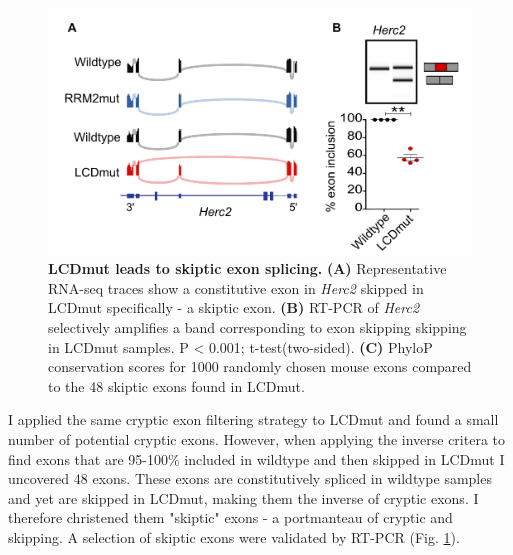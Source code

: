 \begin{figure}[h!]
	\centering
	\includegraphics[width=12cm]{Figures/05_tdp_mice/skiptic_exon_multi.png}
	\caption[LCDmut leads to skiptic exon splicing]{
		\textbf{LCDmut leads to skiptic exon splicing.}
	\textbf{(A)} Representative RNA-seq traces show a constitutive exon in \textit{Herc2} skipped in LCDmut specifically - a skiptic exon. 
	\textbf{(B)} RT-PCR of \textit{Herc2} selectively amplifies a band corresponding to exon skipping skipping in LCDmut samples. P < 0.001; t-test(two-sided). 
	\textbf{(C)} PhyloP conservation scores for 1000 randomly chosen mouse exons compared to the 48 skiptic exons found in LCDmut.
}
	\label{fig:skiptic_multi}
\end{figure}

I applied the same cryptic exon filtering strategy to LCDmut and found a small number of potential cryptic exons. However, when applying the inverse critera to find exons that are 95-100\% included in wildtype and then skipped in LCDmut I uncovered 48 exons. These exons are constitutively spliced in wildtype samples and yet are skipped in LCDmut, making them the inverse of cryptic exons. I therefore christened them "skiptic" exons - a portmanteau of cryptic and skipping. A selection of skiptic exons were validated by RT-PCR (Fig. \ref{fig:skiptic_multi}). 


